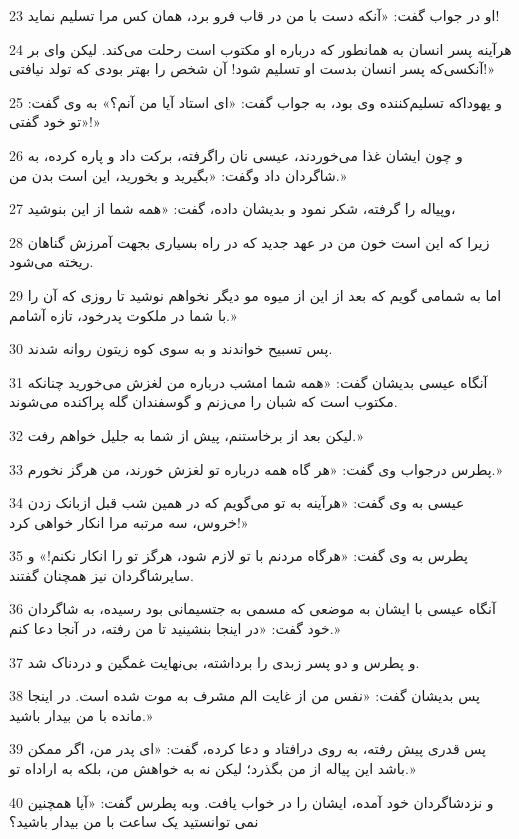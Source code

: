 \par 23 او در جواب گفت: «آنکه دست با من در قاب فرو برد، همان کس مرا تسلیم نماید!
\par 24 هرآینه پسر انسان به همانطور که درباره او مکتوب است رحلت می‌کند. لیکن وای بر آنکسی‌که پسر انسان بدست او تسلیم شود! آن شخص را بهتر بودی که تولد نیافتی!»
\par 25 و یهوداکه تسلیم‌کننده وی بود، به جواب گفت: «ای استاد آیا من آنم؟» به وی گفت: «تو خود گفتی!»
\par 26 و چون ایشان غذا می‌خوردند، عیسی نان راگرفته، برکت داد و پاره کرده، به شاگردان داد وگفت: «بگیرید و بخورید، این است بدن من.»
\par 27 وپیاله را گرفته، شکر نمود و بدیشان داده، گفت: «همه شما از این بنوشید،
\par 28 زیرا که این است خون من در عهد جدید که در راه بسیاری بجهت آمرزش گناهان ریخته می‌شود.
\par 29 اما به شمامی گویم که بعد از این از میوه مو دیگر نخواهم نوشید تا روزی که آن را با شما در ملکوت پدرخود، تازه آشامم.»
\par 30 پس تسبیح خواندند و به سوی کوه زیتون روانه شدند.
\par 31 آنگاه عیسی بدیشان گفت: «همه شما امشب درباره من لغزش می‌خورید چنانکه مکتوب است که شبان را می‌زنم و گوسفندان گله پراکنده می‌شوند.
\par 32 لیکن بعد از برخاستنم، پیش از شما به جلیل خواهم رفت.»
\par 33 پطرس درجواب وی گفت: «هر گاه همه درباره تو لغزش خورند، من هرگز نخورم.»
\par 34 عیسی به وی گفت: «هرآینه به تو می‌گویم که در همین شب قبل ازبانک زدن خروس، سه مرتبه مرا انکار خواهی کرد!»
\par 35 پطرس به وی گفت: «هرگاه مردنم با تو لازم شود، هرگز تو را انکار نکنم!» و سایرشاگردان نیز همچنان گفتند.
\par 36 آنگاه عیسی با ایشان به موضعی که مسمی به جتسیمانی بود رسیده، به شاگردان خود گفت: «در اینجا بنشینید تا من رفته، در آنجا دعا کنم.»
\par 37 و پطرس و دو پسر زبدی را برداشته، بی‌نهایت غمگین و دردناک شد.
\par 38 پس بدیشان گفت: «نفس من از غایت الم مشرف به موت شده است. در اینجا مانده با من بیدار باشید.»
\par 39 پس قدری پیش رفته، به روی در‌افتاد و دعا کرده، گفت: «ای پدر من، اگر ممکن باشد این پیاله از من بگذرد؛ لیکن نه به خواهش من، بلکه به اراداه تو.»
\par 40 و نزدشاگردان خود آمده، ایشان را در خواب یافت. وبه پطرس گفت: «آیا همچنین نمی توانستید یک ساعت با من بیدار باشید؟
